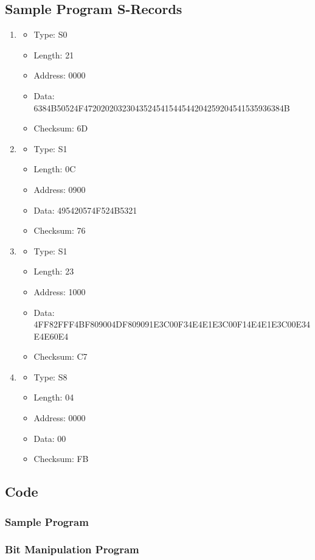 \documentclass[12pt, twocolumn]{article}
\begin{document}
\subsection{Sample Program S-Records}
\begin{enumerate}
	\item 
	\begin{itemize}
		\item Type: S0
		\item Length: 21
		\item Address: 0000
		\item Data: 6384B50524F47202020323043524541544544204259204541535936384B
		\item Checksum: 6D
	\end{itemize}
	\item
	\begin{itemize}
		\item Type: S1
		\item Length: 0C
		\item Address: 0900
		\item Data: 495420574F524B5321
		\item Checksum: 76
	\end{itemize}
	\item 
	\begin{itemize}
		\item Type: S1
		\item Length: 23
		\item Address: 1000
		\item Data: 4FF82FFF4BF809004DF809091E3C00F34E4E1E3C00F14E4E1E3C00E34E4E60E4
		\item Checksum: C7
	\end{itemize}
	\item
	\begin{itemize}
	\item Type: S8
	\item Length: 04
	\item Address: 0000
	\item Data: 00
	\item Checksum: FB
	\end{itemize}
\end{enumerate}

\subsection{Code}\label{code}
\subsubsection{Sample Program}\label{sample}
\lstset{language=[Motorola68k]Assembler}


\subsubsection{Bit Manipulation Program}\label{bitmanip}

\end{document}
